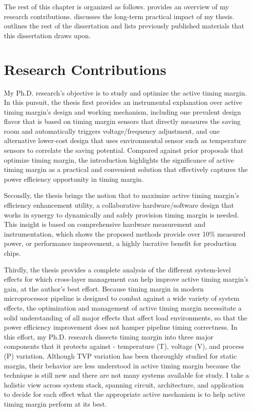 The rest of this chapter is organized as follows.  provides an overview of my research contributions.  discusses the long-term practical impact of my thesis.  outlines the rest of the dissertation and  lists previously published materials that this dissertation draws upon.

\section{Research Contributions}
\label{sec:intro:work}

My Ph.D. research's objective is to study and optimize the active timing margin. In this pursuit, the thesis first provides an instrumental explanation over active timing margin's design and working mechanism, including one prevalent design flavor that is based on timing margin sensors that directly measures the saving room and automatically triggers voltage/frequency adjustment, and one alternative lower-cost design that uses environmental sensor such as temperature sensors to correlate the saving potential. Compared against prior proposals that optimize timing margin, the introduction highlights the significance of active timing margin as a practical and convenient solution that effectively captures the power efficiency opportunity in timing margin.

Secondly, the thesis brings the notion that to maximize active timing margin's efficiency enhancement utility, a collaborative hardware/software design that works in synergy to dynamically and safely provision timing margin is needed. This insight is based on comprehensive hardware measurement and instrumentation, which shows the proposed methods provide over 10\% measured power, or performance improvement, a highly lucrative benefit for production chips.

Thirdly, the thesis provides a complete analysis of the different system-level effects for which cross-layer management can help improve active timing margin's gain, at the author's best effort. Because timing margin in modern microprocessor pipeline is designed to combat against a wide variety of system effects, the optimization and management of active timing margin necessitate a solid understanding of all major effects that affect load environments, so that the power efficiency improvement does not hamper pipeline timing correctness. In this effort, my Ph.D. research dissects timing margin into three major components that it protects against - temperature (T), voltage (V), and process (P) variation. Although TVP variation has been thoroughly studied for static margin, their behavior are less understood in active timing margin because the technique is still new and there are not many systems available for study. I take a holistic view across system stack, spanning circuit, architecture, and application to decide for each effect what the appropriate active mechanism is to help active timing margin perform at its best.

